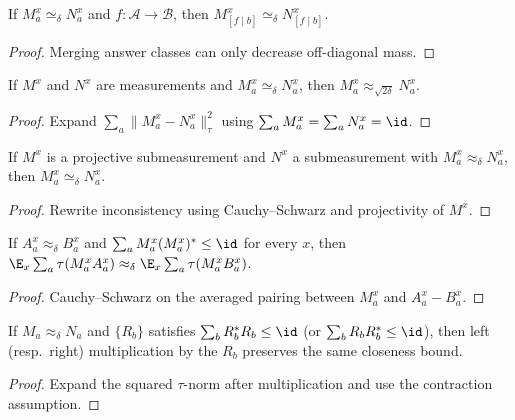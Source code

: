 \begin{proposition}\label{lem:data-processing}
  If $M^x_a\simeq_\delta N^x_a$ and $f\colon\mathcal{A}\to\mathcal{B}$,
  then $M^x_{[f\mid b]}\simeq_\delta N^x_{[f\mid b]}$.
\end{proposition}
\begin{proof}
  Merging answer classes can only decrease off-diagonal mass.
\end{proof}

\begin{proposition}\label{lem:consistency-consequences}
  If $M^x$ and $N^x$ are measurements and $M^x_a\simeq_\delta N^x_a$,
  then $M^x_a\approx_{\sqrt{2\delta}} N^x_a$.
\end{proposition}
\begin{proof}
  Expand $\sum_a\|M^x_a-N^x_a\|_\tau^2$ using $\sum_a M^x_a=\sum_a N^x_a=\id$.
\end{proof}

\begin{proposition}\label{lem:closeness-to-consistency}
  If $M^x$ is a projective submeasurement and $N^x$ a submeasurement with
  $M^x_a\approx_\delta N^x_a$, then $M^x_a\simeq_\delta N^x_a$.
\end{proposition}
\begin{proof}
  Rewrite inconsistency using Cauchy--Schwarz and projectivity of $M^x$.
\end{proof}

\begin{proposition}\label{lem:closeness-to-close-ips}
  If $A^x_a\approx_\delta B^x_a$ and $\sum_a M^x_a(M^x_a)^*\le\id$ for
  every $x$, then
  $\E_x\sum_a\tau(M^x_a A^x_a)\approx_\delta\E_x\sum_a\tau(M^x_a B^x_a)$.
\end{proposition}
\begin{proof}
  Cauchy--Schwarz on the averaged pairing between $M^x_a$ and $A^x_a - B^x_a$.
\end{proof}

\begin{proposition}\label{lem:add-a-proj}
  If $M_a\approx_\delta N_a$ and $\{R_b\}$ satisfies $\sum_b R_b^*R_b\le\id$
  (or $\sum_b R_b R_b^*\le\id$), then left (resp.\ right) multiplication by the
  $R_b$ preserves the same closeness bound.
\end{proposition}
\begin{proof}
  Expand the squared $\tau$-norm after multiplication and use the contraction assumption.
\end{proof}

